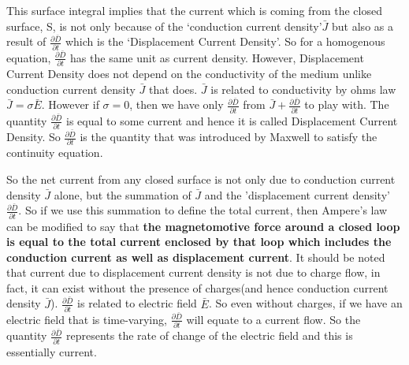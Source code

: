 This surface integral implies that the current which is coming from the closed surface, S, is not only because of the \textquoteleft conduction current density\textquoteright $\bar{J}$ but also as a result of $\frac{\partial\bar{D}}{\partial t}$ which is the \textquoteleft Displacement Current Density\textquoteright. So for a homogenous equation, $\frac{\partial\bar{D}}{\partial t}$ has the same unit as current density. However, Displacement Current Density does not depend on the conductivity of the medium unlike conduction current density $\bar{J}$ that does. $\bar{J}$ is related to conductivity by ohms law $\bar{J}=\sigma\bar{E}$. However if $\sigma=0$, then we have only $\frac{\partial\bar{D}}{\partial t}$ from $\bar{J}+\frac{\partial\bar{D}}{\partial t}$ to play with. The quantity $\frac{\partial\bar{D}}{\partial t}$ is equal to some current and hence it is called Displacement Current Density. So $\frac{\partial\bar{D}}{\partial t}$ is the quantity that was introduced by Maxwell to satisfy the continuity equation.

So the net current from any closed surface is not only due to conduction current density $\bar{J}$ alone, but the summation of $\bar{J}$ and the 'displacement current density' $\frac{\partial\bar{D}}{\partial t}$. So if we use this summation to define the total current, then Ampere's law can be modified to say that \textbf{the magnetomotive force around a closed loop is equal to the total current enclosed by that loop which includes the conduction current as well as displacement current}. It should be noted that current due to displacement current density is not due to charge flow, in fact, it can exist without the presence of charges(and hence conduction current density $\bar{J}$). $\frac{\partial\bar{D}}{\partial t}$ is related to electric field $\bar{E}$. So even without charges, if we have an electric field that is time-varying, $\frac{\partial\bar{D}}{\partial t}$ will equate to a current flow. So the quantity $\frac{\partial\bar{D}}{\partial t}$ represents the rate of change of the electric field and this is essentially current.

